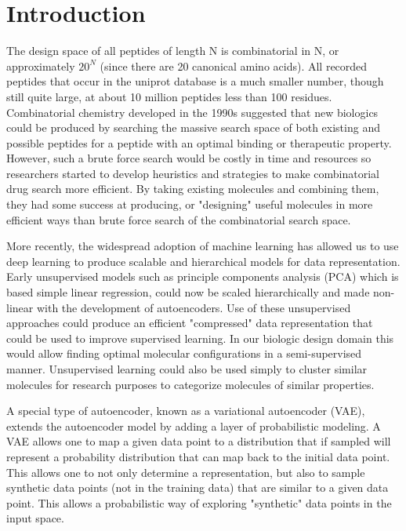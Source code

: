 \documentclass[preprint,12pt]{elsarticle}
\begin{document}
\linenumbers

\section{Introduction}

The design space of all peptides of length N is combinatorial in N, or approximately $20^N$ (since there are 20 canonical amino acids). All recorded peptides that occur in the uniprot database is a much smaller number, though still quite large, at about 10 million peptides less than 100 residues. Combinatorial chemistry developed in the 1990s suggested that new biologics could be produced by searching the massive search space of both existing and possible peptides for a peptide with an optimal binding or therapeutic property. However, such a brute force search would be costly in time and resources so researchers started to develop heuristics and strategies to make combinatorial drug search more efficient\cite{feher2003property}. By taking existing molecules and combining them, they had some success at producing, or "designing" useful molecules in more efficient ways than brute force search of the combinatorial search space.

More recently, the widespread adoption of machine learning has allowed us to use deep learning to produce scalable and hierarchical models for data representation. Early unsupervised models such as principle components analysis (PCA) which is based simple linear regression, could now be scaled hierarchically and made non-linear with the development of autoencoders\cite{hinton1994autoencoders}. Use of these unsupervised approaches could produce an efficient "compressed" data representation that could be used to improve supervised learning. In our biologic design domain this would allow finding optimal molecular configurations in a semi-supervised manner. Unsupervised learning could also be used simply to cluster similar molecules for research purposes to categorize molecules of similar properties.

A special type of autoencoder, known as a variational autoencoder (VAE), extends the autoencoder model by adding a layer of probabilistic modeling\cite{kingma2013auto}. A VAE allows one to map a given data point to a distribution that if sampled will represent a probability distribution that can map back to the initial data point. This allows one to not only determine a representation, but also to sample synthetic data points (not in the training data) that are similar to a given data point. This allows a probabilistic way of exploring "synthetic" data points in the input space.
\end{document}
